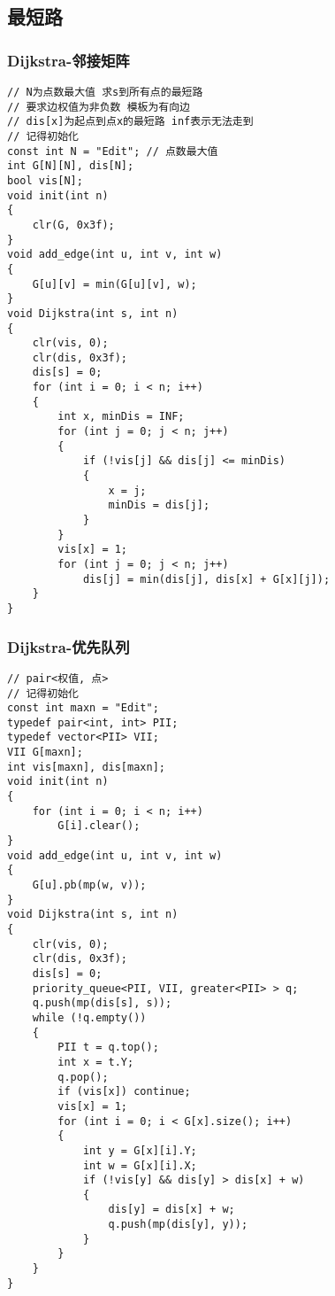 \documentclass[a4]{article}
\begin{document}
\subsection{最短路}
\subsubsection{Dijkstra-邻接矩阵}
\begin{lstlisting}
// N为点数最大值 求s到所有点的最短路
// 要求边权值为非负数 模板为有向边
// dis[x]为起点到点x的最短路 inf表示无法走到
// 记得初始化
const int N = "Edit"; // 点数最大值
int G[N][N], dis[N];
bool vis[N];
void init(int n)
{
    clr(G, 0x3f);
}
void add_edge(int u, int v, int w)
{
    G[u][v] = min(G[u][v], w);
}
void Dijkstra(int s, int n)
{
    clr(vis, 0);
    clr(dis, 0x3f);
    dis[s] = 0;
    for (int i = 0; i < n; i++)
    {
        int x, minDis = INF;
        for (int j = 0; j < n; j++)
        {
            if (!vis[j] && dis[j] <= minDis)
            {
                x = j;
                minDis = dis[j];
            }
        }
        vis[x] = 1;
        for (int j = 0; j < n; j++)
            dis[j] = min(dis[j], dis[x] + G[x][j]);
    }
}
\end{lstlisting}
\subsubsection{Dijkstra-优先队列}
\begin{lstlisting}
// pair<权值, 点>
// 记得初始化
const int maxn = "Edit";
typedef pair<int, int> PII;
typedef vector<PII> VII;
VII G[maxn];
int vis[maxn], dis[maxn];
void init(int n)
{
    for (int i = 0; i < n; i++)
        G[i].clear();
}
void add_edge(int u, int v, int w)
{
    G[u].pb(mp(w, v));
}
void Dijkstra(int s, int n)
{
    clr(vis, 0);
    clr(dis, 0x3f);
    dis[s] = 0;
    priority_queue<PII, VII, greater<PII> > q;
    q.push(mp(dis[s], s));
    while (!q.empty())
    {
        PII t = q.top();
        int x = t.Y;
        q.pop();
        if (vis[x]) continue;
        vis[x] = 1;
        for (int i = 0; i < G[x].size(); i++)
        {
            int y = G[x][i].Y;
            int w = G[x][i].X;
            if (!vis[y] && dis[y] > dis[x] + w)
            {
                dis[y] = dis[x] + w;
                q.push(mp(dis[y], y));
            }
        }
    }
}
\end{lstlisting}
\end{document}

